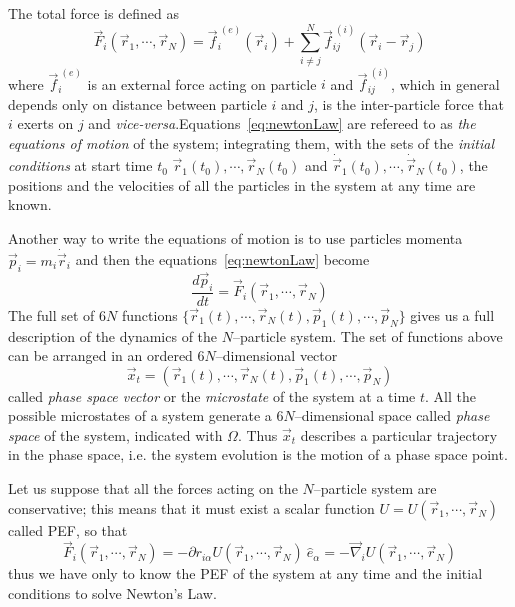 The total force is defined as
\begin{equation*}
	\vec F_i(\vec r_1,\cdots,\vec r_N) = \vec{f}_i^{\ (e)}(\vec r_i) + \sum_{i\ne j}^N \vec{f}_{ij}^{\ (i)}(\vec r_i - \vec r_j )
\end{equation*}
where $\vec{f}_i^{\ (e)}$ is an external force acting on particle $i$ and $\vec{f}_{ij}^{\ (i)}$, which in general
depends only on distance between particle $i$ and $j$, is the inter-particle force that $i$ exerts on $j$ and
\textit{vice-versa}.Equations~\eqref{eq:newtonLaw} are refereed to as \textit{the equations of motion} of the
system; integrating them, with the sets of the \textit{initial conditions} at start time $t_0$ $\vec r_1(t_0),\cdots,\vec r_N(t_0)$ and $\dot{\vec{r}}_1(t_0),\cdots,\dot{\vec{r}}_N(t_0)$, the positions and the
velocities of all the particles in the system at any time are known.

Another way to write the equations of motion is to use particles momenta $\vec p_i = m_i \dot{\vec{r}}_i$ and then
the equations~\eqref{eq:newtonLaw} become
\begin{equation}
	\frac{d\vec p_i}{dt} = \vec F_i(\vec r_1,\cdots,\vec r_N)
	\label{eq:newtonLawMom}
\end{equation}
The full set of $6N$ functions $\{\vec r_1(t),\cdots,\vec r_N(t),\vec p_1(t),\cdots,\vec p_N\}$ gives us a full
description of the dynamics of the $N$--particle system. The set of functions above can be arranged in an ordered $6N$--dimensional vector
\begin{equation}
	\vec x_t = (\vec r_1(t),\cdots,\vec r_N(t),\vec p_1(t),\cdots,\vec p_N)
	\label{eq:phSpaceVector}
\end{equation}
called \textit{phase space vector} or the \textit{microstate} of the system at a time $t$. All the possible
microstates of a system generate a $6N$--dimensional space called \textit{phase space} of the system, indicated with $\Omega$. Thus $\vec x_t$ describes a particular trajectory in the phase space, i.e. the system evolution is the
motion of a phase space point.

Let us suppose that all the forces acting on the $N$--particle system are conservative; this means that it must
exist a scalar function $U = U(\vec r_1, \cdots, \vec r_N)$ called \ac{PEF}, so that
\begin{equation}
	\vec F_i(\vec r_1, \cdots, \vec r_N) = -\partial r_{i\alpha}U(\vec r_1, \cdots, \vec r_N)\ \hat e_\alpha = -\vec\nabla_i U(\vec r_1, \cdots, \vec r_N)
	\label{eq:pefForces}
\end{equation}
thus we have only to know the \ac{PEF} of the system at any time and the initial conditions to solve Newton's Law.

